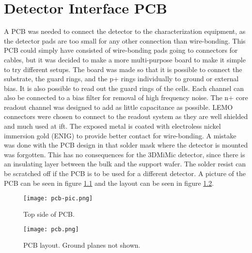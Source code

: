 \documentclass[../main/thesis.tex]{subfiles}
\begin{document}
\chapter{Detector Interface PCB}
\label{a-pcb}

A \gls{PCB} was needed to connect the detector to the characterization equipment, as the detector pads are too small for any other connection than wire-bonding. This \gls{PCB} could simply have consisted of wire-bonding pads going to connectors for cables, but it was decided to make a more multi-purpose board to make it simple to try different setups. The board was made so that it is possible to connect the substrate, the guard rings, and the p+ rings individually to ground or external bias. It is also possible to read out the guard rings of the cells. Each channel can also be connected to a bias filter for removal of high frequency noise. The n+ core readout channel was designed to add as little capacitance as possible. LEMO connectors were chosen to connect to the readout system as they are well shielded and much used at \gls{ift}. The exposed metal is coated with electroless nickel immersion gold (ENIG) to provide better contact for wire-bonding. A mistake was done with the \gls{PCB} design in that solder mask where the detector is mounted was forgotten. This has no consequences for the 3DMiMic detector, since there is an insulating layer between the bulk and the support wafer. The solder resist can be scratched off if the \gls{PCB} is to be used for a different detector. A picture of the \gls{PCB} can be seen in figure \ref{fig-pcb-pic} and the layout can be seen in figure \ref{fig-pcb}. 

\begin{figure}[h]
	\centering
	\texttt{[image: pcb-pic.png]}
	\caption{Top side of PCB.}
	\label{fig-pcb-pic} 
\end{figure}

\begin{figure}%
	\centering
	\texttt{[image: pcb.png]}
	\caption{PCB layout. Ground planes not shown.}
	\label{fig-pcb} 
\end{figure}
\end{document}
